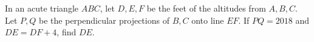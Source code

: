 In an acute triangle $ABC$, let $D,E,F$ be the feet of the altitudes from $A,B,C$. Let $P,Q$ be the perpendicular projections of $B,C$ onto line $EF$. If $PQ=2018$ and $DE=DF+4$, find $DE$.
